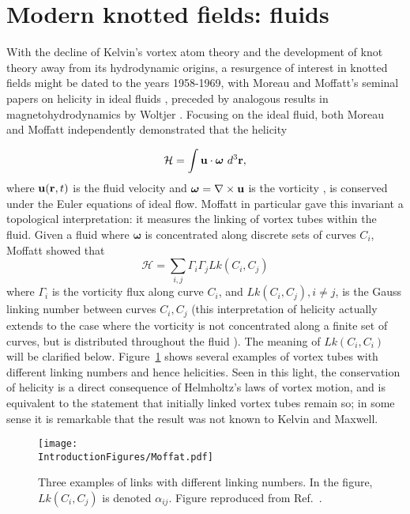 \section{Modern knotted fields: fluids}
\label{sec:Fluids}
With the decline of Kelvin's vortex atom theory and the development of knot theory away from its hydrodynamic origins, a resurgence of interest in knotted fields might be dated to the years 1958-1969, with Moreau and Moffatt's seminal papers on helicity in ideal fluids \citep{Moreau1961,Moffatt1969}, preceded by analogous results in magnetohydrodynamics by Woltjer \citep{Woltjer1958}. Focusing on the ideal fluid, both Moreau and Moffatt independently demonstrated that the helicity

\begin{equation}
    \mathcal{H} = \int {\bf u} \cdot {\boldsymbol{\omega}} \ d^3 \bf r,
\end{equation}
where ${\bf u}({\bf r},t)$ is the fluid velocity and $\boldsymbol{\omega} = \nabla \times \bf u$ is the vorticity \citep{Saffman1992}, is conserved under the Euler equations of ideal flow. Moffatt in particular gave this invariant a topological interpretation: it measures the linking of vortex tubes within the fluid. Given a fluid where $\boldsymbol{\omega}$ is concentrated along discrete sets of curves $C_i$, Moffatt showed that
\begin{equation}
    \mathcal{H} = \sum_{i,j}\Gamma_i \Gamma_j  Lk(C_i,C_j) 
\label{eq:OriginalHelicity}
\end{equation}
where $\Gamma_i$ is the vorticity flux along curve $C_i$, and $Lk(C_i,C_j), i\neq j$, is the Gauss linking number between curves $C_i, C_j$ (this interpretation of helicity actually extends to the case where the vorticity is not concentrated along a finite set of curves, but is distributed throughout the fluid \citep{Arnold1999}). The meaning of $Lk(C_i,C_i)$ will be clarified below. Figure~\ref{fig:Moffat} shows several examples of vortex tubes with different linking numbers and hence helicities. Seen in this light, the conservation of helicity is a direct consequence of Helmholtz's laws of vortex motion, and is equivalent to the statement that initially linked vortex tubes remain so; in some sense it is remarkable that the result was not known to Kelvin and Maxwell.
\begin{figure}[htbp]
\centering
\texttt{[image: \\IntroductionFigures/Moffat.pdf]}
\caption{Three examples of links with different linking numbers. In the figure, $Lk(C_i,C_j)$ is denoted $\alpha_{ij}$. Figure reproduced from Ref.~\citep{Moffatt1969}.}
\label{fig:Moffat}
\end{figure}

